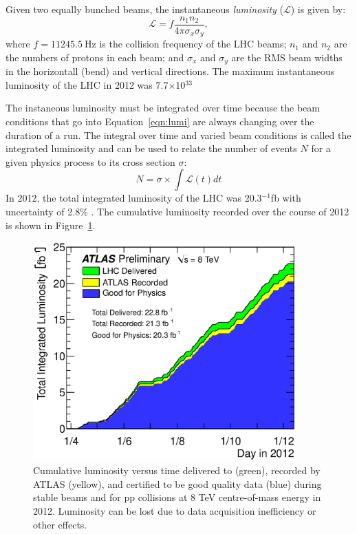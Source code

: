 Given two equally bunched beams, the instantaneous \textit{luminosity} ($\mathcal{L}$) is given by:
\begin{equation}\label{eqn:lumi}
  \mathcal{L} = f \frac{n_1 n_2}{4\pi \sigma_x\sigma_y},
\end{equation}
where $f=\SI{11245.5}{\hertz}$ is the collision frequency of the LHC beams; $n_{1}$ and $n_{2}$ are the numbers of protons in each beam; and $\sigma_{x}$ and $\sigma_{y}$ are the RMS beam widths in the horizontall (bend) and vertical directions.\cite{PDG} The maximum instantaneous luminosity of the LHC in 2012 was 7.7$\times$10$^{33}$

The instaneous luminosity must be integrated over time because the beam conditions that go into Equation~\ref{eqn:lumi} are always changing over the duration of a run. The integral over time and varied beam conditions is called the integrated luminosity and can be used to relate the number of events $N$ for a given physics process to its cross section $\sigma$:
\begin{equation}\label{eqn:nevt}
  N = \sigma \times \int{\mathcal{L}(t) dt}
\end{equation}
In 2012, the total integrated luminosity of the LHC was 20.3$^{-1}$fb with uncertainty of 2.8\% \cite{Lumi}. The cumulative luminosity recorded over the course of 2012 is shown in Figure~\ref{fig:2012lumi}.
\begin{figure}[tp]
  \centering
  \includegraphics[width=0.90\textwidth]{fig/atlas/intlumivstime2012DQ.eps}
  \caption{Cumulative luminosity versus time delivered to (green), recorded by ATLAS (yellow), and certified to be good quality data (blue) during stable beams and for pp collisions at 8 TeV centre-of-mass energy in 2012. Luminosity can be lost due to data acquisition inefficiency or other effects.}
  \label{fig:2012lumi}
\end{figure}

